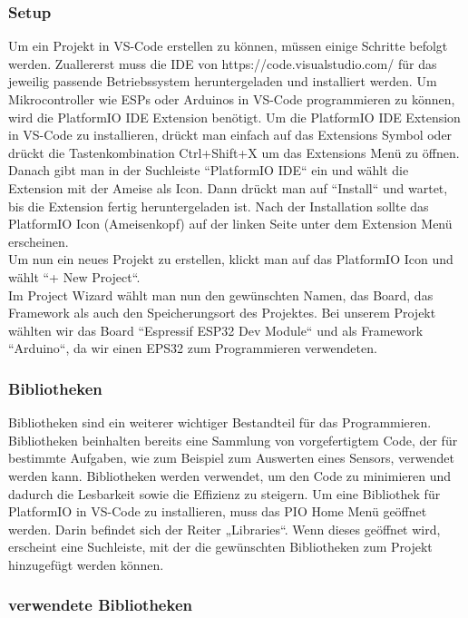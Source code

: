 \documentclass[ngerman,12pt,a4paper]{article}
\begin{document}
	 	\subsubsection{Setup}
	 	
	 Um ein Projekt in VS-Code erstellen zu können, müssen einige Schritte befolgt werden. Zuallererst muss die IDE von https://code.visualstudio.com/ für das jeweilig passende Betriebssystem heruntergeladen und installiert werden. Um Mikrocontroller wie ESPs oder Arduinos in VS-Code programmieren zu können, wird die PlatformIO IDE Extension benötigt. Um die PlatformIO IDE Extension in VS-Code zu installieren, drückt man einfach auf das Extensions Symbol oder drückt die Tastenkombination Ctrl+Shift+X um das Extensions Menü zu öffnen. Danach gibt man in der Suchleiste “PlatformIO IDE“ ein und wählt die Extension mit der Ameise als Icon. Dann drückt man auf “Install“ und wartet, bis die Extension fertig heruntergeladen ist. Nach der Installation sollte das PlatformIO Icon (Ameisenkopf) auf der linken Seite unter dem Extension Menü erscheinen. \\[0.5cm]
	 Um nun ein neues Projekt zu erstellen, klickt man auf das PlatformIO Icon und wählt “+ New Project“. \\[0.5cm]
	 Im Project Wizard wählt man nun den gewünschten Namen, das Board, das Framework als auch den Speicherungsort des Projektes. Bei unserem Projekt wählten wir das Board “Espressif ESP32 Dev Module“ und als Framework “Arduino“, da wir einen EPS32 zum Programmieren verwendeten. \\[0.5cm]
	 	
	 	
	 	\subsubsection{Bibliotheken}
	 	
	 Bibliotheken sind ein weiterer wichtiger Bestandteil für das Programmieren. Bibliotheken beinhalten bereits eine Sammlung von vorgefertigtem Code, der für bestimmte Aufgaben, wie zum Beispiel zum Auswerten eines Sensors, verwendet werden kann. Bibliotheken werden verwendet, um den Code zu minimieren und dadurch die Lesbarkeit sowie die Effizienz zu steigern. Um eine Bibliothek für PlatformIO in VS-Code zu installieren, muss das PIO Home Menü geöffnet werden. Darin befindet sich der Reiter „Libraries“. Wenn dieses geöffnet wird, erscheint eine Suchleiste, mit der die gewünschten Bibliotheken zum Projekt hinzugefügt werden können.
	 
		\subsubsection{verwendete Bibliotheken}
		
\end{document}
